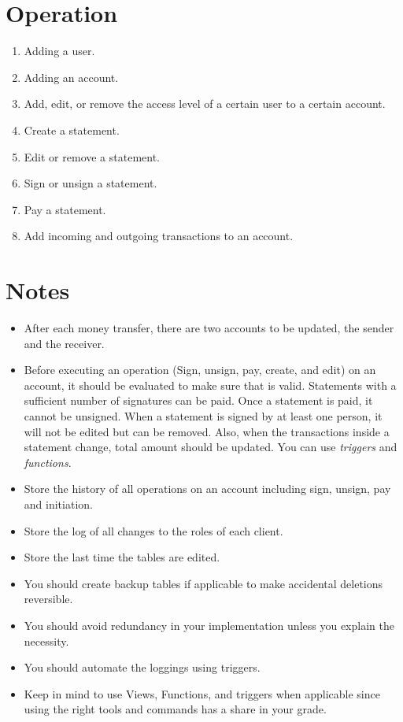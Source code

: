 \documentclass{homework}
\begin{document}
\section*{Operation}
\begin{enumerate}
    \item Adding a user.
    \item Adding an account.
    \item Add, edit, or remove the access level of a certain user to a certain account.
    \item Create a statement.
    \item Edit or remove a statement.
    \item Sign or unsign a statement.
    \item Pay a statement.
    \item Add incoming and outgoing transactions to an account.
\end{enumerate}

\section*{Notes}
\begin{itemize}
    \item After each money transfer, there are two accounts to be updated, the sender and the receiver.
    \item Before executing an operation (Sign, unsign, pay, create, and edit) on an account, it should be evaluated to make sure that is valid. Statements with a sufficient number of signatures can be paid. Once a statement is paid, it cannot be unsigned. When a statement is signed by at least one person, it will not be edited but can be removed. Also, when the transactions inside a statement change, total amount should be updated. You can use \textit{triggers} and \textit{functions}.
    \item Store the history of all operations on an account including sign, unsign, pay and initiation.
    \item Store the log of all changes to the roles of each client.
    \item Store the last time the tables are edited.
    \item You should create backup tables if applicable to make accidental deletions reversible.
    \item You should avoid redundancy in your implementation unless you explain the necessity.
    \item You should automate the loggings using triggers.
    \item Keep in mind to use Views, Functions, and triggers when applicable since using the right tools and commands has a share in your grade.
    \end{itemize}
\end{document}

